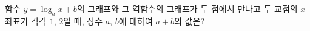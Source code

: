 함수 $y=\log_a x+b$의 그래프와 그 역함수의 그래프가 두 점에서 만나고 두 교점의 $x$좌표가 각각 $1$, $2$일 때, 상수 $a$, $b$에 대하여 $a+b$의 값은? 
